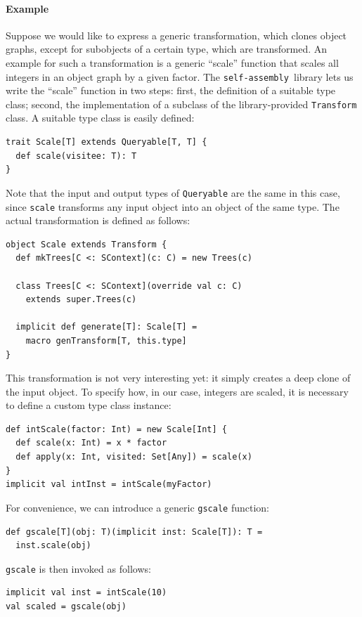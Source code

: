 \documentclass[preprint,nocopyrightspace]{sigplanconf}
\newcommand{\selfassembly}{\texttt{self-assembly~}}
\begin{document}
\paragraph{Example}
Suppose we would like to express a generic transformation,
which clones object graphs, except for subobjects of a certain type, which
are transformed. An example for such a transformation is a generic ``scale''
function that scales all integers in an object graph by a given factor.
The \selfassembly library lets us write the ``scale'' function in two steps:
first, the definition of a suitable type class; second, the implementation of
a subclass of the library-provided \verb|Transform| class. A suitable type
class is easily defined:
\begin{lstlisting}
trait Scale[T] extends Queryable[T, T] {
  def scale(visitee: T): T
}
\end{lstlisting}
\noindent
Note that the input and output types of \verb|Queryable| are the same in this
case, since \verb|scale| transforms any input object into an
object of the same type. The actual transformation is defined as follows:
\begin{lstlisting}
object Scale extends Transform {
  def mkTrees[C <: SContext](c: C) = new Trees(c)

  class Trees[C <: SContext](override val c: C)
    extends super.Trees(c)

  implicit def generate[T]: Scale[T] =
    macro genTransform[T, this.type]
}
\end{lstlisting}
\noindent
This transformation is not very interesting yet: it simply creates a deep
clone of the input object. To specify how, in our case, integers are scaled,
it is necessary to define a custom type class instance:
\begin{lstlisting}
def intScale(factor: Int) = new Scale[Int] {
  def scale(x: Int) = x * factor
  def apply(x: Int, visited: Set[Any]) = scale(x)
}
implicit val intInst = intScale(myFactor)
\end{lstlisting}
\noindent
For convenience, we can introduce a generic \verb|gscale| function:

\begin{lstlisting}
def gscale[T](obj: T)(implicit inst: Scale[T]): T =
  inst.scale(obj)
\end{lstlisting}
\noindent
\verb|gscale| is then invoked as follows:
\begin{lstlisting}
implicit val inst = intScale(10)
val scaled = gscale(obj)
\end{lstlisting}
\end{document}
